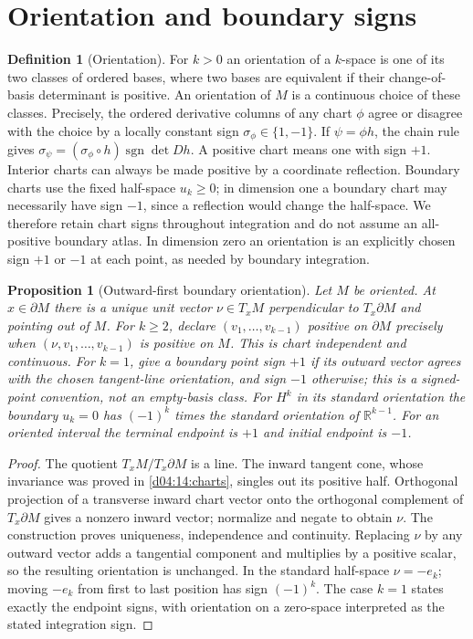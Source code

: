 \documentclass[11pt,oneside,openany]{book}
\newtheorem{proposition}[theorem]{Proposition}
\theoremstyle{definition}
\newtheorem{definition}[theorem]{Definition}
\theoremstyle{remark}
\newcommand{\R}{\mathbb R}
\DeclareMathOperator{\sgn}{sgn}
\newcommand{\family}[1]{}
\begin{document}
\section{Orientation and boundary signs}
\family{K04.14.05}\family{K04.14.06}\family{K04.14.09}
\begin{definition}[Orientation]\label{d04:14:orientation}
For $k>0$ an orientation of a $k$-space is one of its two classes of ordered
bases, where two bases are equivalent if their change-of-basis determinant
is positive. An orientation of $M$ is a continuous choice of these classes.
Precisely, the ordered derivative columns of any chart $\phi$ agree or
disagree with the choice by a locally constant sign $\sigma_\phi\in\{1,-1\}$.
If $\psi=\phi h$, the chain rule gives
$\sigma_\psi=(\sigma_\phi\circ h)\sgn\det Dh$.
A positive chart means one with sign $+1$. Interior charts can always be
made positive by a coordinate reflection. Boundary charts use the fixed
half-space $u_k\ge0$; in dimension one a boundary chart may necessarily
have sign $-1$, since a reflection would change the half-space.
We therefore retain chart signs throughout integration and do not assume
an all-positive boundary atlas. In dimension zero an orientation is an explicitly chosen
sign $+1$ or $-1$ at each point, as needed by boundary integration.
\end{definition}

\begin{proposition}[Outward-first boundary orientation]\label{d04:14:boundary-orientation}
Let $M$ be oriented. At $x\in\partial M$ there is a unique unit vector
$\nu\in T_xM$ perpendicular to $T_x\partial M$ and pointing out of $M$.
For $k\ge2$, declare $(v_1,\ldots,v_{k-1})$ positive on $\partial M$ precisely when
$(\nu,v_1,\ldots,v_{k-1})$ is positive on $M$. This is chart independent
and continuous. For $k=1$, give a boundary point sign $+1$ if its outward
vector agrees with the chosen tangent-line orientation, and sign $-1$
otherwise; this is a signed-point convention, not an empty-basis class.
For $H^k$ in its standard orientation the boundary
$u_k=0$ has $(-1)^k$ times the standard orientation of $\R^{k-1}$.
For an oriented interval the terminal endpoint is $+1$ and initial endpoint
is $-1$.
\end{proposition}
\begin{proof}
The quotient $T_xM/T_x\partial M$ is a line. The inward tangent cone,
whose invariance was proved in \cref{d04:14:charts}, singles out its positive
half. Orthogonal projection of a transverse inward chart vector onto the
orthogonal complement of $T_x\partial M$ gives a nonzero inward vector;
normalize and negate to obtain $\nu$. The construction proves uniqueness,
independence and continuity. Replacing $\nu$ by any outward vector adds a
tangential component and multiplies by a positive scalar, so the resulting
orientation is unchanged. In the standard half-space $\nu=-e_k$; moving
$-e_k$ from first to last position has sign $(-1)^k$. The case $k=1$
states exactly the endpoint signs, with orientation on a zero-space
interpreted as the stated integration sign.
\end{proof}
\end{document}
